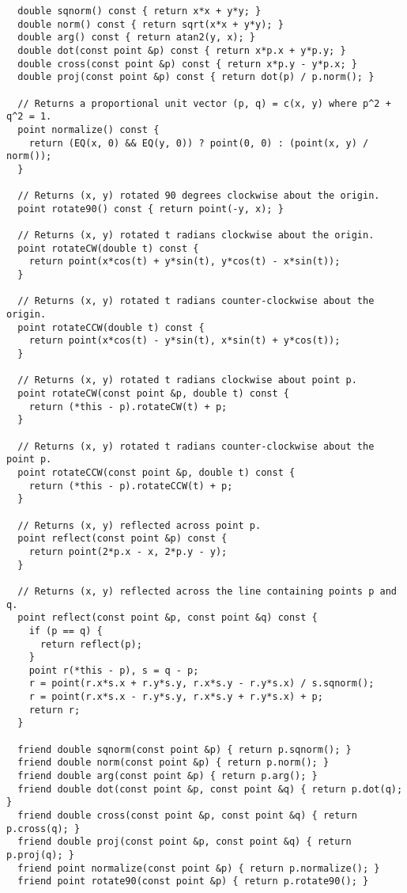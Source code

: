 \begin{lstlisting}
  double sqnorm() const { return x*x + y*y; }
  double norm() const { return sqrt(x*x + y*y); }
  double arg() const { return atan2(y, x); }
  double dot(const point &p) const { return x*p.x + y*p.y; }
  double cross(const point &p) const { return x*p.y - y*p.x; }
  double proj(const point &p) const { return dot(p) / p.norm(); }

  // Returns a proportional unit vector (p, q) = c(x, y) where p^2 + q^2 = 1.
  point normalize() const {
    return (EQ(x, 0) && EQ(y, 0)) ? point(0, 0) : (point(x, y) / norm());
  }

  // Returns (x, y) rotated 90 degrees clockwise about the origin.
  point rotate90() const { return point(-y, x); }

  // Returns (x, y) rotated t radians clockwise about the origin.
  point rotateCW(double t) const {
    return point(x*cos(t) + y*sin(t), y*cos(t) - x*sin(t));
  }

  // Returns (x, y) rotated t radians counter-clockwise about the origin.
  point rotateCCW(double t) const {
    return point(x*cos(t) - y*sin(t), x*sin(t) + y*cos(t));
  }

  // Returns (x, y) rotated t radians clockwise about point p.
  point rotateCW(const point &p, double t) const {
    return (*this - p).rotateCW(t) + p;
  }

  // Returns (x, y) rotated t radians counter-clockwise about the point p.
  point rotateCCW(const point &p, double t) const {
    return (*this - p).rotateCCW(t) + p;
  }

  // Returns (x, y) reflected across point p.
  point reflect(const point &p) const {
    return point(2*p.x - x, 2*p.y - y);
  }

  // Returns (x, y) reflected across the line containing points p and q.
  point reflect(const point &p, const point &q) const {
    if (p == q) {
      return reflect(p);
    }
    point r(*this - p), s = q - p;
    r = point(r.x*s.x + r.y*s.y, r.x*s.y - r.y*s.x) / s.sqnorm();
    r = point(r.x*s.x - r.y*s.y, r.x*s.y + r.y*s.x) + p;
    return r;
  }

  friend double sqnorm(const point &p) { return p.sqnorm(); }
  friend double norm(const point &p) { return p.norm(); }
  friend double arg(const point &p) { return p.arg(); }
  friend double dot(const point &p, const point &q) { return p.dot(q); }
  friend double cross(const point &p, const point &q) { return p.cross(q); }
  friend double proj(const point &p, const point &q) { return p.proj(q); }
  friend point normalize(const point &p) { return p.normalize(); }
  friend point rotate90(const point &p) { return p.rotate90(); }


\end{lstlisting}
